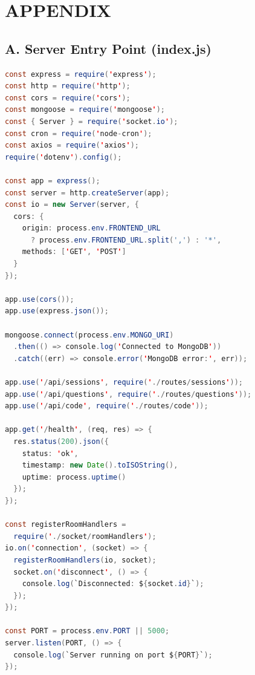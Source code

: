 \documentclass[12pt,a4paper,oneside]{report}
\begin{document}
\chapter*{APPENDIX}

\section*{A. Server Entry Point (index.js)}

\begin{lstlisting}[language=Java, caption={Server Entry Point -- index.js}]
const express = require('express');
const http = require('http');
const cors = require('cors');
const mongoose = require('mongoose');
const { Server } = require('socket.io');
const cron = require('node-cron');
const axios = require('axios');
require('dotenv').config();

const app = express();
const server = http.createServer(app);
const io = new Server(server, {
  cors: {
    origin: process.env.FRONTEND_URL
      ? process.env.FRONTEND_URL.split(',') : '*',
    methods: ['GET', 'POST']
  }
});

app.use(cors());
app.use(express.json());

mongoose.connect(process.env.MONGO_URI)
  .then(() => console.log('Connected to MongoDB'))
  .catch((err) => console.error('MongoDB error:', err));

app.use('/api/sessions', require('./routes/sessions'));
app.use('/api/questions', require('./routes/questions'));
app.use('/api/code', require('./routes/code'));

app.get('/health', (req, res) => {
  res.status(200).json({
    status: 'ok',
    timestamp: new Date().toISOString(),
    uptime: process.uptime()
  });
});

const registerRoomHandlers =
  require('./socket/roomHandlers');
io.on('connection', (socket) => {
  registerRoomHandlers(io, socket);
  socket.on('disconnect', () => {
    console.log(`Disconnected: ${socket.id}`);
  });
});

const PORT = process.env.PORT || 5000;
server.listen(PORT, () => {
  console.log(`Server running on port ${PORT}`);
});
\end{lstlisting}
\end{document}
